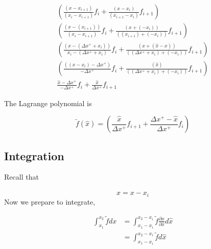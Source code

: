 \begin{align*}
    \left( \frac{
            \left( x - x_{i+1} \right)
            }{
            \left( x_i - x_{i+1} \right)
        }
        f_i
        + \frac{
            \left( x - x_i  \right)
            }{
            \left(x_{i+1}- x_i \right)
        }
        f_{i+1}
    \right) \\
    \left( 
        \frac{
            \left( x - \left( x_{i+1} \right) \right)
            }{
            \left( x_i - x_{i+1}\right)
        } 
        f_i + 
        \frac{
            \left( x + \left( -x_i \right) \right)
            }{
            \left( \left( x_{i+1} \right) + \left( -x_i \right) \right)
        }
        f_{i+1}
    \right) \\
    \left(
        \frac{
            (x-\left( \Delta x^+ + x_i \right)) 
            }{
            x_i - (\Delta x^+ + x_i)
        }
        f_i
        +
        \frac{ 
            \left( x + \left( \hat{x} - x \right) \right)
            }{
            \left( \left( \Delta x^+ + x_i \right) + \left( -x_i \right) \right)
        }
        f_{i+1}
    \right)  \\
    \left(
        \frac{
            (\left(x-x_i  \right) -\Delta x^+)   
            }{ 
            - \Delta x^+ 
        }
        f_i
        +
        \frac{
            \left(   \hat{x}    \right)
            }{\left( \left(  \Delta x^+ + x_i \right)  + \left( -x_i \right) \right)
        } f_{i+1}
    \right) \\
    \frac{
        \hat{x} - \Delta x^+
        }{
        -\Delta x^+
    }
    f_i
    +
    \frac{
        \hat{x}
        }{
        \Delta x^+
    }
    f_{i+1}
\end{align*}

The Lagrange polynomial is

\begin{equation*}
    \widetilde{f}\left( \hat{x} \right) 
    =
    \left( 
        \frac{\hat{x}}{\Delta x^+}f_{i+1} +
        \frac{\Delta x^+ - \hat{x}}{\Delta x^+}f_i
    \right)
\end{equation*}

\subsection{Integration}

Recall that 

\[ \hat{x} = x - x_i\]
Now we prepare to integrate,

\begin{align*}
    \int_{x_1}^{x_2} \widetilde{f} dx &=
    \int_{x_1-x_i}^{x_2-x_i} \widetilde{f} \frac{\partial x}{\partial \hat{x}}d\hat{x}\\
                                      &=
                                      \int_{x_1-x_i}^{x_2 - x_i} \widetilde{f} d\hat{x}
\end{align*}

